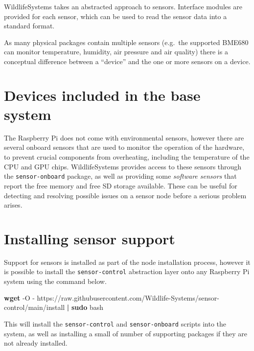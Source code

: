 \documentclass[
]{book}
\newenvironment{Shaded}{\begin{snugshade}}{\end{snugshade}}
\newcommand{\AttributeTok}[1]{\textcolor[rgb]{0.13,0.29,0.53}{#1}}
\newcommand{\FunctionTok}[1]{\textcolor[rgb]{0.13,0.29,0.53}{\textbf{#1}}}
\newcommand{\KeywordTok}[1]{\textcolor[rgb]{0.13,0.29,0.53}{\textbf{#1}}}
\newcommand{\NormalTok}[1]{#1}
\begin{document}
WildlifeSystems takes an abstracted approach to sensors. Interface modules are provided for each sensor, which can be used to read the sensor data into a standard format.

As many physical packages contain multiple sensors (e.g.~the supported BME680 can monitor temperature, humidity, air pressure and air quality) there is a conceptual difference between a ``device'' and the one or more sensors on a device.

\section{Devices included in the base system}\label{devices-included-in-the-base-system}

The Raspberry Pi does not come with environmental sensors, however there are several onboard sensors that are used to monitor the operation of the hardware, to prevent crucial components from overheating, including the temperature of the CPU and GPU chips. WildlifeSystems provides access to these sensors through the \texttt{sensor-onboard} package, as well as providing some \emph{software sensors} that report the free memory and free SD storage available. These can be useful for detecting and resolving possible issues on a sensor node before a serious problem arises.

\section{Installing sensor support}\label{installing-sensor-support}

Support for sensors is installed as part of the node installation process, however it is possible to install the \texttt{sensor-control} abstraction layer onto any Raspberry Pi system using the command below.

\begin{Shaded}
\begin{Highlighting}[]
\FunctionTok{wget} \AttributeTok{{-}O} \AttributeTok{{-}}\NormalTok{ https://raw.githubusercontent.com/Wildlife{-}Systems/sensor{-}control/main/install }\KeywordTok{|} \FunctionTok{sudo}\NormalTok{ bash}
\end{Highlighting}
\end{Shaded}

This will install the \texttt{sensor-control} and \texttt{sensor-onboard} scripts into the system, as well as installing a small of number of supporting packages if they are not already installed.
\end{document}
